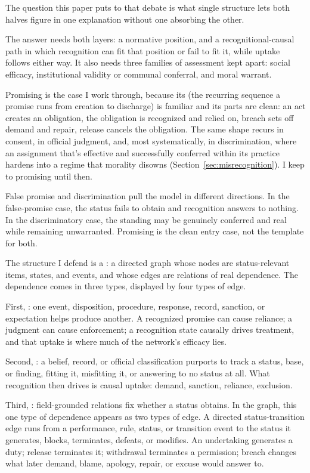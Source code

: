 \documentclass[12pt]{article}
\begin{document}
The question this paper puts to that debate is what single structure lets both halves figure in one explanation without one absorbing the other.

The answer needs both layers: a normative position, and a recognitional-causal path in which recognition can fit that position or fail to fit it, while uptake follows either way. It also needs three families of assessment kept apart: social efficacy, institutional validity or communal conferral, and moral warrant.

Promising is the case I work through, because its  (the recurring sequence a promise runs from creation to discharge) is familiar and its parts are clean: an act creates an obligation, the obligation is recognized and relied on, breach sets off demand and repair, release cancels the obligation. The same shape recurs in consent, in official judgment, and, most systematically, in discrimination, where an assignment that's effective and successfully conferred within its practice hardens into a regime that morality disowns (Section~\ref{sec:misrecognition}). I keep to promising until then.

False promise and discrimination pull the model in different directions. In the false-promise case, the status fails to obtain and recognition answers to nothing. In the discriminatory case, the standing may be genuinely conferred and real while remaining unwarranted. Promising is the clean entry case, not the template for both.

The structure I defend is a : a directed graph whose nodes are status-relevant items, states, and events, and whose edges are relations of real dependence. The dependence comes in three types, displayed by four types of edge.

First, : one event, disposition, procedure, response, record, sanction, or expectation helps produce another. A recognized promise can cause reliance; a judgment can cause enforcement; a recognition state causally drives treatment, and that uptake is where much of the network's efficacy lies.

Second, : a belief, record, or official classification purports to track a status, base, or finding, fitting it, misfitting it, or answering to no status at all. What recognition then drives is causal uptake: demand, sanction, reliance, exclusion.

Third, : field-grounded relations fix whether a status obtains. In the graph, this one type of dependence appears as two types of edge. A directed status-transition edge runs from a performance, rule, status, or transition event to the status it generates, blocks, terminates, defeats, or modifies. An undertaking generates a duty; release terminates it; withdrawal terminates a permission; breach changes what later demand, blame, apology, repair, or excuse would answer to.
\end{document}
